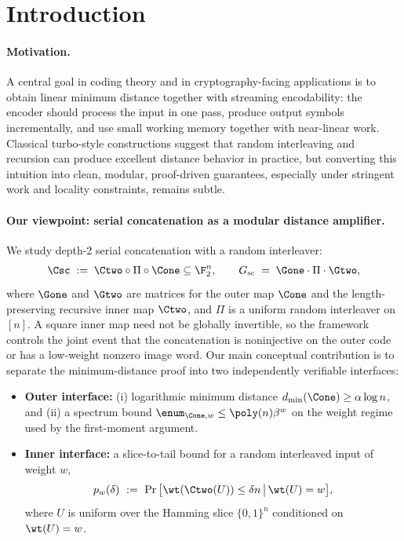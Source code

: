 \section{Introduction}
\label{sec:intro}

\paragraph{Motivation.}
A central goal in coding theory and in cryptography-facing applications is to obtain linear minimum distance together with
streaming encodability: the encoder should process the input in one pass, produce output symbols incrementally, and use
small working memory together with near-linear work.  Classical turbo-style constructions suggest that random interleaving
and recursion can produce excellent distance behavior in practice, but converting this intuition into
clean, modular, proof-driven guarantees, especially under stringent work and locality constraints, remains subtle.

\paragraph{Our viewpoint: serial concatenation as a modular distance amplifier.}
We study depth-2 serial concatenation with a random interleaver:
\[
\Csc \;:=\; \Ctwo \circ \Pi \circ \Cone \subseteq \F_2^n,
\qquad
G_{\mathrm{sc}} \;=\; \Gone \cdot \Pi \cdot \Gtwo,
\]
where \(\Gone\) and \(\Gtwo\) are matrices for the outer map \(\Cone\) and
the length-preserving recursive inner map \(\Ctwo\), and \(\Pi\) is a uniform
random interleaver on \([n]\).  A square inner map need not be globally
invertible, so the framework controls the joint event that the concatenation
is noninjective on the outer code or has a low-weight nonzero image word.
Our main conceptual contribution is to separate the minimum-distance proof into two independently verifiable interfaces:

\begin{itemize}
\item \textbf{Outer interface:} (i) logarithmic minimum distance \(d_{\min}(\Cone)\ge \alpha\log n\), and
(ii) a spectrum bound \(\enum_{\Cone,w}\le \poly(n)\beta^w\) on the weight regime used by the first-moment argument.
\item \textbf{Inner interface:} a slice-to-tail bound for a random interleaved input of weight \(w\),
\[
p_w(\delta)\ :=\ \Pr\big[\wt(\Ctwo(U))\le \delta n \,\big|\, \wt(U)=w\big],
\]
where \(U\) is uniform over the Hamming slice \(\{0,1\}^n\) conditioned on \(\wt(U)=w\).
\end{itemize}

